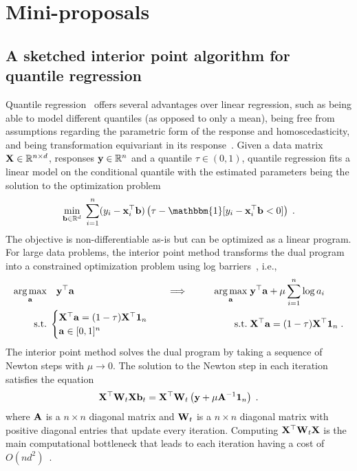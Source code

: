 

\section{Mini-proposals}

\subsection*{A sketched interior point algorithm for quantile regression} %

Quantile regression~\citep{Koenker:1978} offers several advantages over linear regression, such as being able to model different quantiles (as opposed to only a mean), being free from assumptions regarding the parametric form of the response and homoscedasticity, and being transformation equivariant in its response~\citep{Rodriguez:2017}. Given a data matrix $\mathbf{X}\in\mathbb{R}^{n\times d}$, responses $\mathbf{y}\in\mathbb{R}^{n}$ and a quantile $\tau\in(0,1)$, quantile regression fits a linear model on the conditional quantile with the estimated parameters being the solution to the optimization problem
\[
\min_{\bfb\in\bbR^d} \; \sum_{i=1}^n(y_i-\bfx_i^\T\bfb)\left(\tau - \mathbbm{1}[y_i-\bfx_i^\top\bfb < 0]\right) \;.
\]
The objective is non-differentiable as-is but can be optimized as a linear program. For large data problems, the interior point method transforms the dual program into a constrained optimization problem using log barriers~\citep{Portnoy:1997}, i.e.,
\begin{align*}
\operatorname*{arg\,max}_{\mathbf{a}}&\quad \mathbf{y}^\top\mathbf{a} & &\Longrightarrow\qquad & 
\operatorname*{arg\,max}_{\mathbf{a}}&\; \mathbf{y}^\top\mathbf{a}+\mu\sum_{i=1}^n\log a_i \\
\text{s.t.}&\;\begin{cases}
\mathbf{X}^\top\mathbf{a}=(1-\tau)\mathbf{X}^\top\mathbf{1}_n \\ \mathbf{a}\in[0,1]^n 
\end{cases} &&& \text{s.t.}&\; \mathbf{X}^\top\mathbf{a}=(1-\tau)\mathbf{X}^\top\mathbf{1}_n \;.
\end{align*}
The interior point method solves the dual program by taking a sequence of Newton steps with $\mu\rightarrow0$. The solution to the Newton step in each iteration satisfies the equation
\[
\mathbf{X}^\top\mathbf{W}_t\mathbf{X}\mathbf{b}_t = \mathbf{X}^\top\mathbf{W}_t\left(\mathbf{y}+\mu\mathbf{A}^{-1}\mathbf{1}_n\right) \;.
\]
where $\mathbf{A}$ is a $n\times n$ diagonal matrix and $\mathbf{W}_t$ is a $n\times n$ diagonal matrix with positive diagonal entries that update every iteration. Computing $\mathbf{X}^\top\mathbf{W}_t\mathbf{X}$ is the main computational bottleneck that leads to each iteration having a cost of $O(nd^2)$~\citep{Chen:2005}.
\\

